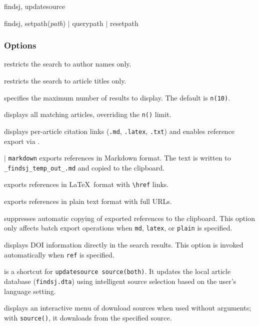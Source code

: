 \begin{stsyntax}
    findsj, updatesource
\end{stsyntax}

\begin{stsyntax}
    findsj,
    setpath({\it path}) $|$ querypath $|$ resetpath
\end{stsyntax}

\subsubsection{Options}

 restricts the search to author names only.

 restricts the search to article titles only.

 specifies the maximum number of results to display. The default is {\tt n(10)}.

 displays all matching articles, overriding the {\tt n()} limit.

 displays per-article citation links ({\tt .md}, {\tt .latex}, {\tt .txt}) and enables reference export via .

 $|$ {\tt markdown} exports references in Markdown format. The text is written to {\tt \_findsj\_temp\_out\_.md} and copied to the clipboard.

 exports references in \LaTeX\ format with {\tt \textbackslash href} links.

 exports references in plain text format with full URLs.

 suppresses automatic copying of exported references to the clipboard. This option only affects batch export operations when {\tt md}, {\tt latex}, or {\tt plain} is specified.

 displays DOI information directly in the search results. This option is invoked automatically when {\tt ref} is specified.

 is a shortcut for {\tt updatesource source(both)}. It updates the local article database ({\tt findsj.dta}) using intelligent source selection based on the user's language setting.

 displays an interactive menu of download sources when used without arguments; with {\tt source()}, it downloads from the specified source.

